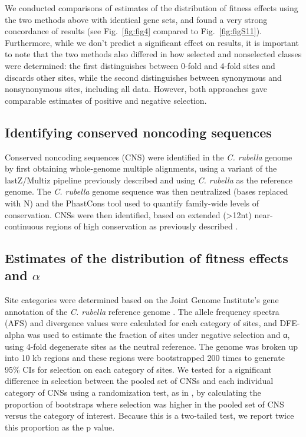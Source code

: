 We conducted comparisons of estimates of the distribution of fitness effects using the two methods above with identical gene sets, and found a very strong concordance of results (see Fig.~\ref{fig:fig4} compared to Fig.~\ref{fig:figS11}). Furthermore, while we don't predict a significant effect on results, it is important to note that the two methods also differed in how selected and nonselected classes were determined: the first distinguishes between 0-fold and 4-fold sites and discards other sites, while the second distinguishes between synonymous and nonsynonymous sites, including all data. However, both approaches gave comparable estimates of positive and negative selection.

\subsection{Identifying conserved noncoding sequences}
Conserved noncoding sequences (CNS) were identified in the \textit{C. rubella} genome by first obtaining whole-genome multiple alignments, using a variant of the lastZ/Multiz pipeline previously described \citep{Haudry2013-qe,blanchette2004} and using \textit{C. rubella} as the reference genome. The \textit{C. rubella} genome sequence was then neutralized (bases replaced with N) and the PhastCons tool used to quantify family-wide levels of conservation. CNSs were then identified, based on extended (>12nt) near-continuous regions of high conservation as previously described \citep{Haudry2013-qe}.

\subsection{Estimates of the distribution of fitness effects and $\alpha$}
Site categories were determined based on the Joint Genome Institute’s gene annotation of the \textit{C. rubella} reference genome \citep{Slotte2013-py}. The allele frequency spectra (AFS) and divergence values were calculated for each category of sites, and DFE-alpha \citep{keightley2007,eyre2009} was used to estimate the fraction of sites under negative selection and α, using 4-fold degenerate sites as the neutral reference. The genome was broken up into 10 kb regions and these regions were bootstrapped 200 times to generate 95\% CIs for selection on each category of sites. We tested for a significant difference in selection between the pooled set of CNSs and each individual category of CNSs using a randomization test, as in \citet{eyre2009}, by calculating the proportion of bootstraps where selection was higher in the pooled set of CNS versus the category of interest. Because this is a two-tailed test, we report twice this proportion as the p value. 

